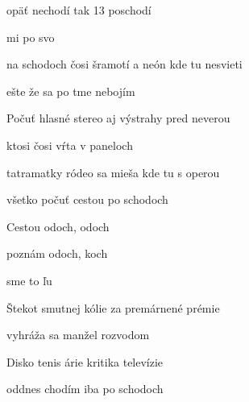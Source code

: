 

\zs
{} opäť nechodí tak  13 poschodí

 mi  po svo

na schodoch čosi šramotí a neón kde tu nesvieti

ešte že sa po tme nebojím
\ks

\zs
Počuť hlasné stereo aj výstrahy pred neverou

ktosi čosi vŕta v paneloch

tatramatky ródeo sa mieša kde tu s operou

všetko počuť cestou po schodoch
\ks

\zr
Cestou odoch, odoch

 

poznám odoch, koch

 sme to  ľu
\kr

\zs
Štekot smutnej kólie za premárnené prémie

vyhráža sa manžel rozvodom

Disko tenis árie kritika televízie

oddnes chodím iba po schodoch
\ks

\kp





